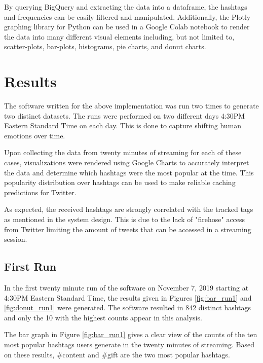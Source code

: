 \documentclass[conference]{IEEEtran}
\begin{document}
By querying BigQuery and extracting the data into a dataframe, the hashtags and frequencies can be easily filtered and manipulated. Additionally, the Plotly graphing library for Python can be used in a Google Colab notebook to render the data into many different visual elements including, but not limited to, scatter-plots, bar-plots, histograms, pie charts, and donut charts. \par

\section{Results}
The software written for the above implementation was run two times to generate two distinct datasets. The runs were performed on two different days 4:30PM Eastern Standard Time on each day. This is done to capture shifting human emotions over time.  \par

Upon collecting the data from twenty minutes of streaming for each of these cases, visualizations were rendered using Google Charts to accurately interpret the data and determine which hashtags were the most popular at the time. This popularity distribution over hashtags can be used to make reliable caching predictions for Twitter. \par

As expected, the received hashtags are strongly correlated with the tracked tags as mentioned in the system design. This is due to the lack of "firehose" access from Twitter limiting the amount of tweets that can be accessed in a streaming session. \par

\subsection{First Run}
In the first twenty minute run of the software on November 7, 2019 starting at 4:30PM Eastern Standard Time, the results given in Figures \ref{fig:bar_run1} and \ref{fig:donut_run1} were generated. The software resulted in 842 distinct hashtags and only the 10 with the highest counts appear in this analysis. \par

The bar graph in Figure \ref{fig:bar_run1} gives a clear view of the counts of the ten most popular hashtags users generate in the twenty minutes of streaming. Based on these results, \#content and \#gift are the two most popular hashtags. \par
\end{document}
